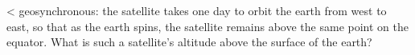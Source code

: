  <%
geosynchronous: the satellite takes one day to orbit the
earth from west to east, so that as the earth spins, the
satellite remains above the same point on the equator. What
is such a satellite's altitude above the surface of the earth?
